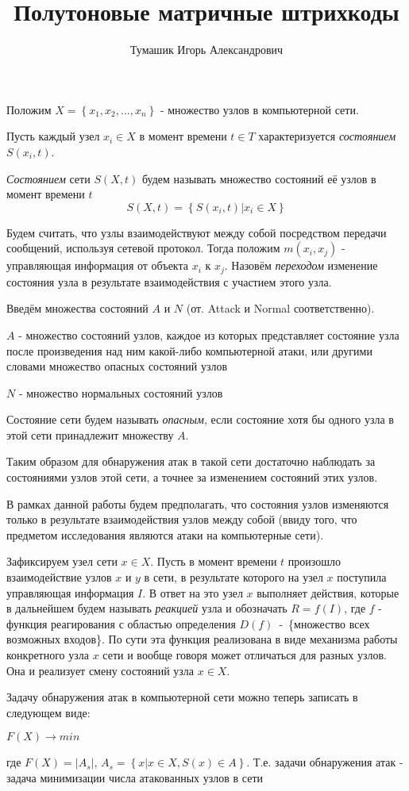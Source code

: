 \documentclass[12pt,a4paper]{article}
\author{Тумашик Игорь Александрович}
\title{Полутоновые матричные штрихкоды}
\begin{document}
Положим $X = \left\{x_1, x_2, ..., x_n\right\} $ - множество узлов в компьютерной сети.

Пусть каждый узел $x_i \in X$ в момент времени $t \in T$ характеризуется \textit{состоянием} $S(x_i, t)$.

\textit{Состоянием} сети $S(X, t)$ будем называть множество состояний её узлов в момент времени $t$
\begin{equation}
S(X, t) = \left\{S(x_i, t) | x_i \in X\right\}
\end{equation}


Будем считать, что узлы взаимодействуют между собой посредством передачи сообщений, используя сетевой протокол. Тогда положим $m(x_i, x_j)$ - управляющая информация от объекта $x_i$ к $x_j$. Назовём \textit{переходом} изменение состояния узла в результате взаимодействия с участием этого узла. 

Введём множества состояний $A$ и $N$ (от. Attack и Normal соответственно).

$A$ - множество состояний узлов, каждое из которых представляет состояние узла после произведения над ним какой-либо компьютерной атаки, или другими словами множество опасных состояний узлов

$N$ - множество нормальных состояний узлов

Состояние сети будем называть \textit{опасным}, если состояние хотя бы одного узла в этой сети принадлежит множеству $A$.

Таким образом для обнаружения атак в такой сети достаточно наблюдать за состояниями узлов этой сети, а точнее за изменением состояний этих узлов. 

В рамках данной работы будем предполагать, что состояния узлов изменяются только в результате взаимодействия узлов между собой (ввиду того, что предметом исследования являются атаки на компьютерные сети).


Зафиксируем узел сети $x \in X$. 
Пусть в момент времени $t$ произошло взаимодействие узлов $x$ и $y$ в сети, в результате которого на узел $x$ поступила управляющая информация $I$. В ответ на это узел $x$ выполняет действия, которые в дальнейшем будем называть \textit{реакцией} узла и обозначать $R = f(I)$, где $f$ - функция реагирования с областью определения $D(f)$~-~\{множество всех возможных входов\}. По сути эта функция реализована в виде механизма работы конкретного узла $x$ сети и вообще говоря может отличаться для разных узлов. Она и реализует смену состояний узла $x \in X$.

Задачу обнаружения атак в компьютерной сети можно теперь записать в следующем виде:
\begin{center}

$F(X) \rightarrow min$

\end{center}
где $F(X) = \left|A_s\right|$, $A_s = \left\{ x | x \in X , S(x) \in A \right\}$. Т.е. задачи обнаружения атак - задача минимизации числа атакованных узлов в сети
\end{document}
